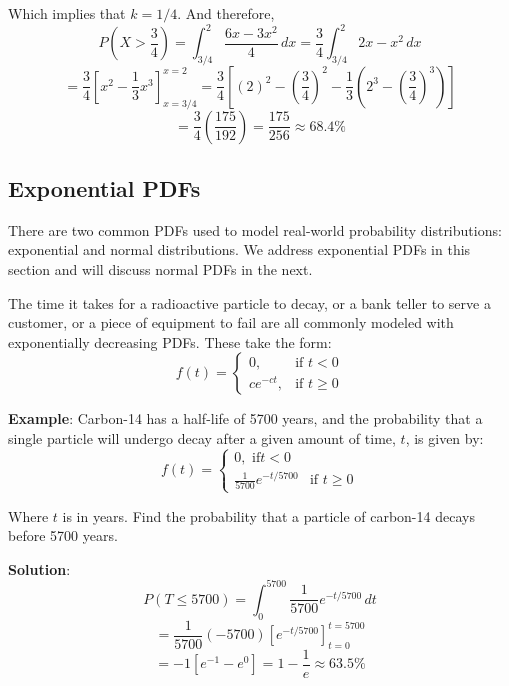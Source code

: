 \begin{Answer}[ref = int_pdf]
\begin{enumerate}
    Which implies that $k = 1/4$. And therefore,
    $$P(X > \frac{3}{4} ) = \int_{3/4}^2 \frac{6x - 3x^2}{4}\,dx = \frac{3}{4} 
    \int_{3/4}^2 2x - x^2\,dx$$
    $$= \frac{3}{4} \left[ x^2 - \frac{1}{3}x^3 \right]_{x = 3/4}^{x = 2} = 
    \frac{3}{4} \left[ (2)^2 - \left( \frac{3}{4} \right)^2 - \frac{1}{3} 
    \left( 2^3 - \left( \frac{3}{4} \right)^3 \right) \right]$$
    $$= \frac{3}{4} \left( \frac{175}{192} \right) = \frac{175}{256} \approx 
    68.4\%$$
\end{enumerate}
\end{Answer}

\subsection{Exponential PDFs}
There are two common PDFs used to model real-world probability distributions: 
exponential and normal distributions. We address exponential PDFs in this 
section and will discuss normal PDFs in the next. 

The time it takes for a radioactive particle to decay, or a bank teller to 
serve a customer, or a piece of equipment to fail are all commonly modeled 
with exponentially decreasing PDFs. These take the form:
$$f(t) = 
\begin{cases}
0,&\text{if }t<0\\
ce^{-ct},&\text{if }t \geq 0
\end{cases}$$

\textbf{Example}: Carbon-14 has a half-life of 5700 years, and the probability 
that a single particle will undergo decay after a given amount of time, $t$, 
is given by:
$$f(t) = 
\begin{cases}
    0,\text{ if}t<0\\
    \frac{1}{5700}e^{-t/5700}&\text{if }t \geq 0
\end{cases}$$

Where $t$ is in years. Find the probability that a particle of carbon-14 
decays before 5700 years. 

\textbf{Solution}: 
$$P(T \leq 5700) = \int_0^{5700} \frac{1}{5700} e^{-t/5700}\,dt$$
$$= \frac{1}{5700} \left(-5700 \right) \left[e^{-t/5700} \right]_{t = 0}^{
t = 5700}$$
$$= -1 \left[ e^{-1} - e^{0} \right] = 1 - \frac{1}{e} \approx 63.5\%$$

